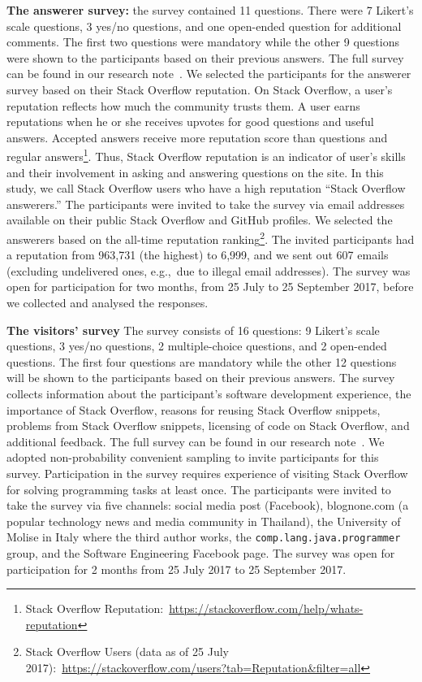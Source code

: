 \documentclass[10pt,journal,compsoc]{IEEEtran}
\begin{document}
\textbf{The answerer survey:} the survey contained
11 questions. There were 7 Likert's scale questions, 3 yes/no questions, and one
open-ended question for additional comments. The first two questions were
mandatory while the other 9 questions were shown to the participants based on
their previous answers. The full survey can be found in our research note~\cite{Ragkhitwetsagul_RN2017}.
We selected the participants for the answerer survey based on their Stack Overflow
reputation. On Stack Overflow, a user's reputation reflects how much the
community trusts them. A user earns reputations when he or she receives upvotes
for good questions and useful answers. Accepted answers receive more reputation
score than questions and regular answers\footnote{Stack Overflow
	Reputation:~\url{https://stackoverflow.com/help/whats-reputation}}. Thus, Stack
Overflow reputation is an indicator of user's skills and their involvement in
asking and answering questions on the site. In this study, we call Stack
Overflow users who have a high reputation ``Stack Overflow answerers.''
The participants were invited to take the survey via email addresses available
on their public Stack Overflow and GitHub profiles. We selected the answerers
based on the all-time reputation ranking\footnote{Stack Overflow Users (data as
	of 25 July 2017):~\url{https://stackoverflow.com/users?tab=Reputation&filter=all}}. The
invited participants had a reputation from 963,731 (the highest) to 6,999, and
we sent out 607 emails (excluding undelivered ones, e.g.,\ due to
illegal email addresses). 
The survey was
open for participation for two months, from 25 July to 25 September 2017, before
we collected and analysed the responses.

\textbf{The visitors' survey}
The survey consists of 16 questions: 9 Likert's
scale questions, 3 yes/no questions, 2 multiple-choice questions, and 2
open-ended questions. 
The first four questions are mandatory while the other 12
questions will be shown to the participants based on their previous answers. 
The survey collects information about the participant's software development
experience, the importance of Stack Overflow, reasons for reusing Stack Overflow
snippets, problems from Stack Overflow snippets, licensing of code on Stack
Overflow, and additional feedback. 
The full survey can be found in our research note~\cite{Ragkhitwetsagul_RN2017}.
We adopted non-probability convenient sampling to invite participants for this
survey. Participation in the survey requires experience of visiting Stack
Overflow for solving programming tasks at least once. The participants were
invited to take the survey via five channels: social media post (Facebook),
\textsf{blognone.com} (a popular technology news and media community in Thailand), 
the University of Molise in Italy where the third author
works, the \texttt{comp.lang.java.programmer} group, and the Software Engineering
Facebook page. 
The survey was open for participation for 2 months 
from 25 July 2017 to 25 September 2017.
\end{document}
